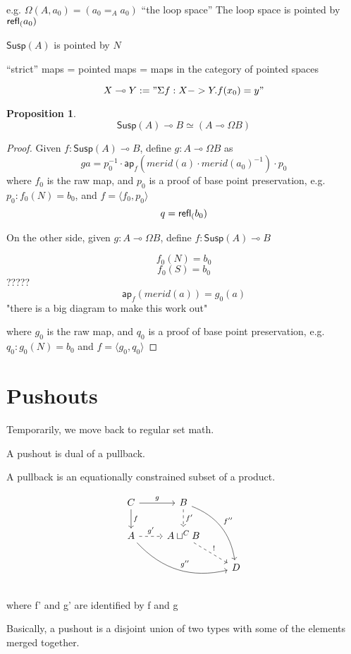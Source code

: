 \documentclass[11pt]{article}
\newcommand{\lolli}{\multimap}
\newcommand*{\ap}{\mathsf{ap}}
\newcommand{\susp}[1]{\mathsf{Susp}(#1)}
\newtheorem{proposition}{Proposition}
\begin{document}
e.g. $\Omega(A, a_0) = (a_0 =_A a_0)$ ``the loop space''
The loop space is pointed by $\mathsf{refl}_{(} a_0)$

$\susp{A}$ is pointed by $N$

``strict'' maps = pointed maps = maps in the category of pointed spaces

$$X \lolli Y := "\Sigma f : X -> Y . f(x_0) = y"$$
\begin{proposition}
$$\susp{A} \lolli B \simeq (A \lolli \Omega B)$$
\end{proposition}
\begin{proof}
Given $f : \susp{A} \lolli B$, define $g : A \lolli \Omega B$ as
$$g a = p_0^{-1} \cdot \ap_f(merid(a) \cdot merid(a_0)^{-1}) \cdot p_0$$
where $f_0$ is the raw map, and $p_0$ is a proof of base point preservation, e.g. $p_0 : f_0(N) = b_0$, and $f = \langle f_0, p_0\rangle$
$$q = \mathsf{refl}_{(} b_0)$$

On the other side, given $g : A \lolli \Omega B$, define $f : \susp{A} \lolli B$

$$f_0(N) = b_0$$
$$f_0(S) = b_0$$
?????
$$\ap_f(merid(a)) = g_0(a)$$
"there is a big diagram to make this work out"

where $g_0$ is the raw map, and $q_0$ is a proof of base point preservation, e.g. $q_0 : g_0(N) = b_0$ and $f = \langle g_0, q_0\rangle$
\end{proof}

\section{Pushouts}
Temporarily, we move back to regular set math.

A pushout is dual of a pullback.

A pullback is an equationally constrained subset of a product.

\begin{equation*}
\begin{tikzcd}
C \arrow{r}{g} \arrow{d}{f} & B \arrow[dashed]{d}{f'} \arrow[bend left]{ddr}{f''}\\
A \arrow[dashed]{r}{g'} \arrow[bend right]{drr}{g''} & A \sqcup^C B \arrow[dashed]{dr}{!}\\
{} & {} & D\\
\end{tikzcd}
\end{equation*}
where f' and g' are identified by f and g

Basically, a pushout is a disjoint union of two types with some of the elements merged together.
\end{document}
